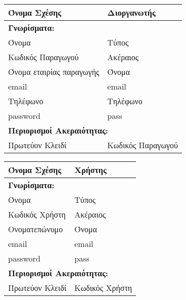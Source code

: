 \begin{tabular}{|p{6cm}|p{8cm}|}
  \hline
  Όνομα Σχέσης             & Διοργανωτής                   \\ \hline
  \multicolumn{2}{|l|}{\textbf{Γνωρίσματα:}}               \\ \hline
  Όνομα                    & Τύπος                         \\ \hline
  Κωδικός Παραγωγού        & Ακέραιος                      \\ \hline
  Όνομα εταιρίας παραγωγής & Όνομα                         \\ \hline
  email                    & email                         \\ \hline
  Τηλέφωνο                 & Τηλέφωνο                      \\ \hline
  password                 & pass                          \\ \hline
  \multicolumn{2}{|l|}{\textbf{Περιορισμοί Ακεραιότητας:}} \\ \hline
  Πρωτεύον Κλειδί          & Κωδικός Παραγωγού             \\ \hline
\end{tabular}


\begin{tabular}{|p{6cm}|p{8cm}|}
  \hline
  Όνομα Σχέσης    & Χρήστης                                \\ \hline
  \multicolumn{2}{|l|}{\textbf{Γνωρίσματα:}}               \\ \hline
  Όνομα           & Τύπος                                  \\ \hline
  Κωδικός Χρήστη  & Ακέραιος                               \\ \hline
  Ονοματεπώνυμο   & Όνομα                                  \\ \hline
  email           & email                                  \\ \hline
  password        & pass                                   \\ \hline
  \multicolumn{2}{|l|}{\textbf{Περιορισμοί Ακεραιότητας:}} \\ \hline
  Πρωτεύον Κλειδί & Κωδικός Χρήστη                         \\ \hline
\end{tabular}


